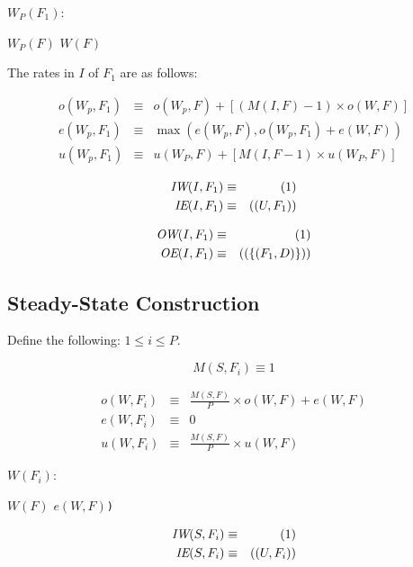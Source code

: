\begin{algorithm}
$W_P(F_1)$:
\begin{algorithmic}[1]
\State $W_P(F)$
\State $W(F)$
\EndFor
\end{algorithmic}
\end{algorithm}

The rates in $I$ of $F_1$ are as follows:
 
\begin{eqnarray*} 
o(W_p,F_1) & \equiv & o(W_p,F) + [(M(I,F) - 1) \times o(W,F)] \\
e(W_p,F_1) & \equiv & \max(e(W_p,F), o(W_p,F_1) + e(W,F)) \\
u(W_p,F_1) & \equiv & u(W_P,F) + [M(I,F - 1) \times u(W_P,F)]
\end{eqnarray*} 

\begin{eqnarray*}
\mbox{\it IW}(I,F_1) & \equiv & (1) \\
\mbox{\it IE}(I,F_1) & \equiv & ((U,F_1)) 
\end{eqnarray*}

\begin{eqnarray*} 
\mbox{\it OW}(I,F_1) & \equiv & (1) \\
\mbox{\it OE}(I,F_1) & \equiv & ((\{(F_1, D)\})) 
\end{eqnarray*} 

\subsection{Steady-State Construction}
Define the following: $1 \le i \le P$.
 
$$ M(S,F_i) \equiv 1 $$

\begin{eqnarray*} 
o(W,F_i) & \equiv & \frac{M(S,F)}{P} \times o(W,F) + e(W,F)\\
e(W,F_i) & \equiv & 0 \\
u(W,F_i) & \equiv & \frac{M(S,F)}{P} \times u(W,F)
\end{eqnarray*} 

\begin{algorithm}
$W(F_i)$:
\begin{algorithmic}[1]
\State $W(F)$
\EndFor
{}$e(W,F)${\tt)}
\end{algorithmic}
\end{algorithm}

\begin{eqnarray*}
\mbox{\it IW}(S,F_i) & \equiv & (1) \\
\mbox{\it IE}(S,F_i) & \equiv & ((U,F_i)) 
\end{eqnarray*}

